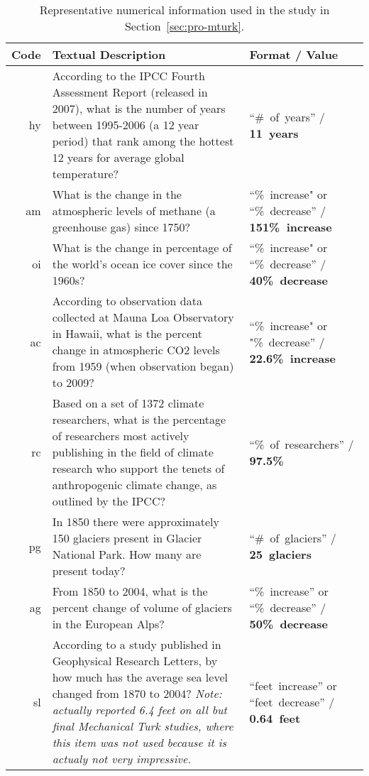 \begin{table}
    \caption{Representative numerical information used in the study in
        Section~\ref{sec:pro-mturk}.}
    \label{table:pro-numbers1}
    \begin{tabu}{>{\sffamily}rX[3]X[-1,l]}
        \toprule
        Code & Textual Description & Format / Value \\
        \midrule
        hy &
According to the IPCC Fourth Assessment Report (released in 2007), what is the
number of years between 1995-2006 (a 12 year period) that rank among the hottest
12 years for average global temperature? &
“\#~of~years” / \textbf{11~years} \\

am &
What is the change in the atmospheric levels of methane (a greenhouse gas) since
1750? &
“\%~increase" or “\%~decrease” /
\textbf{151\%~increase} \\

oi &
What is the change in percentage of the world's ocean ice cover since the 1960s?
&
“\%~increase" or “\%~decrease” /
\textbf{40\%~decrease} \\

ac &
According to observation data collected at Mauna Loa Observatory in Hawaii, what
is the percent change in atmospheric CO2 levels from 1959 (when observation
began) to 2009?	&
“\%~increase" or "\%~decrease” /
\textbf{22.6\%~increase} \\

rc &
Based on a set of 1372 climate researchers, what is the percentage of
researchers most actively publishing in the field of climate research who
support the tenets of anthropogenic climate change, as outlined by the IPCC? &
“\%~of~researchers” /
\textbf{97.5\%} \\

pg &
In 1850 there were approximately 150 glaciers present in Glacier National Park.
How many are present today?	&
“\#~of~glaciers” /
\textbf{25~glaciers} \\

ag &
From 1850 to 2004, what is the percent change of volume of glaciers in the
European Alps? &
“\%~increase” or “\%~decrease” /
\textbf{50\%~decrease} \\

sl &
According to a study published in Geophysical Research Letters, by how much has
the average sea level changed from 1870 to 2004?  \emph{Note: actually reported 6.4
feet on all but final Mechanical Turk studies, where this item was not used
because it is actualy not very impressive.} &
“feet~increase” or “feet~decrease” /
\textbf{0.64~feet} \\

    \bottomrule
    \end{tabu}
\end{table}

